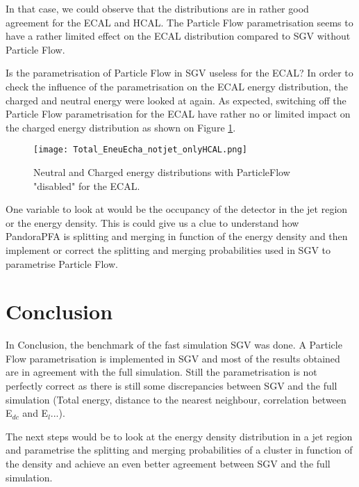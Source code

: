\documentclass[a4paper,12pt]{article}
\begin{document}
In that case, we could observe that the distributions are in rather good agreement for the ECAL and HCAL. The Particle Flow parametrisation seems to have a rather limited effect on the ECAL distribution compared to SGV without Particle Flow. 

Is the parametrisation of Particle Flow in SGV useless for the ECAL? In order to check the influence of the parametrisation on the ECAL energy distribution, the charged and neutral energy were looked at again. As expected, switching off the Particle Flow parametrisation for the ECAL have rather no or limited impact on the charged energy distribution as shown on Figure \ref{fig:energy_ECALnoPFA}.

\begin{figure}[!h]
   \centering
    \texttt{[image: Total\_EneuEcha\_notjet\_onlyHCAL.png]}
      \caption{Neutral and Charged energy distributions with ParticleFlow "disabled" for the ECAL.}
   \label{fig:energy_ECALnoPFA}
\end{figure}

One variable to look at would be the occupancy of the detector in the jet region or the energy density. This is could give us a clue to understand how PandoraPFA is splitting and merging in function of the energy density and then implement or correct the splitting and merging probabilities used in SGV to parametrise Particle Flow.

\section{Conclusion}

In Conclusion, the benchmark of the fast simulation SGV was done. A Particle Flow parametrisation is implemented in SGV and most of the results obtained are in agreement with the full simulation. Still the parametrisation is not perfectly correct as there is still some discrepancies between SGV and the full simulation (Total energy, distance to the nearest neighbour, correlation between E$_{dc}$ and E$_l$...).

The next steps would be to look at the energy density distribution in a jet region and parametrise the splitting and merging probabilities of a cluster in function of the density and achieve an even better agreement between SGV and the full simulation.

\medskip
\end{document}
